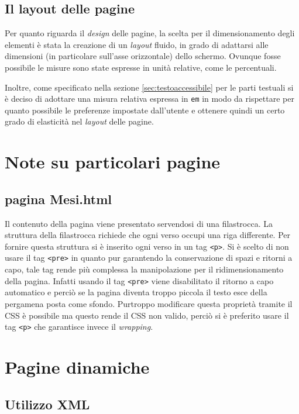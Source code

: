\documentclass[10pt,a4paper,onecolumn]{article}
\newcommand{\inglese}[1]{\foreignlanguage{english}{\itshape{}#1}}
\begin{document}
\subsection{Il layout delle pagine}
Per quanto riguarda il \inglese{design} delle pagine, la scelta per il dimensionamento degli elementi è stata la creazione di un \inglese{layout} fluido, in grado di adattarsi alle dimensioni (in particolare sull'asse orizzontale) dello schermo. Ovunque fosse possibile le misure sono state espresse in unità relative, come le percentuali.

Inoltre, come specificato nella sezione \ref{sec:testoaccessibile} per le parti testuali si è deciso di adottare una misura relativa espressa in \texttt{em} in modo da rispettare per quanto possibile le preferenze impostate dall'utente e ottenere quindi un certo grado di elasticità nel \inglese{layout} delle pagine.

\section{Note su particolari pagine}
\subsection{pagina Mesi.html}
Il contenuto della pagina viene presentato servendosi di una filastrocca. La struttura della filastrocca richiede che ogni verso occupi una riga differente. Per fornire questa struttura si è inserito ogni verso in un tag \texttt{<p>}.
Si è scelto di non usare il tag \texttt{<pre>} in quanto pur garantendo la conservazione di spazi e ritorni a capo, tale tag rende più complessa la manipolazione per il ridimensionamento della pagina.
Infatti usando il tag \texttt{<pre>} viene disabilitato il ritorno a capo automatico e perciò se la pagina diventa troppo piccola il testo esce della pergamena posta come sfondo. Purtroppo modificare questa proprietà tramite il CSS è possibile ma questo rende il CSS non valido, perciò si è preferito usare il tag \texttt{<p>} che garantisce invece il \inglese{wrapping}.

\section{Pagine dinamiche}

\subsection{Utilizzo XML}
\end{document}
